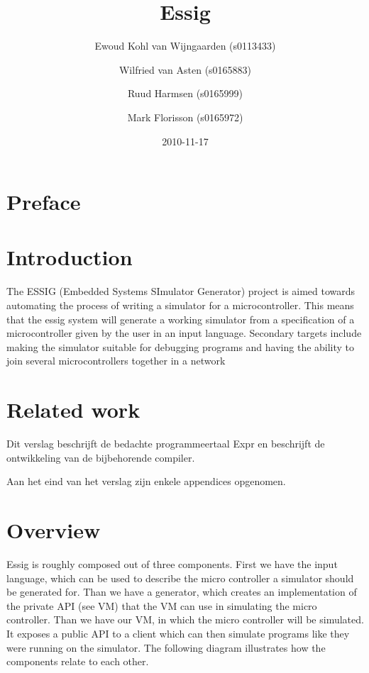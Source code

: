 \documentclass[a4paper]{report}
\title{Essig}
\author{
	Ewoud Kohl van Wijngaarden (s0113433)
	\and
	Wilfried van Asten (s0165883)
	\and
	Ruud Harmsen (s0165999)
	\and
	Mark Florisson (s0165972)
}
\date{2010-11-17}
\begin{document}
\maketitle





\setcounter{tocdepth}{10}
\renewcommand\contentsname{Table of Contents}
\tableofcontents
\clearpage{}%
\chapter{Preface}


\clearpage\chapter{Introduction}
The ESSIG (Embedded Systems SImulator Generator) project is aimed
towards automating the process of writing a simulator for a
microcontroller. This means that the essig system will generate a
working simulator from a specification of a microcontroller given by
the user in an input language. Secondary targets include making the
simulator suitable for debugging programs and having the ability to
join several microcontrollers together in a network

\clearpage\chapter{Related work}
Dit verslag beschrijft de bedachte programmeertaal Expr en beschrijft de
ontwikkeling van de bijbehorende compiler.

Aan het eind van het verslag zijn enkele appendices opgenomen.

\clearpage\chapter{Overview}
Essig is roughly composed out of three components. First we have the
input language, which can be used to describe the micro controller a
simulator should be generated for. Than we have a generator, which
creates an implementation of the private API (see VM) that the VM can
use in simulating the micro controller. Than we have our VM, in which
the micro controller will be simulated. It exposes a public API to a
client which can then simulate programs like they were running on the
simulator. The following diagram illustrates how the components relate
to each other.
\end{document}

